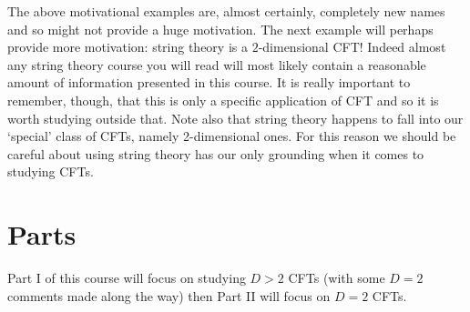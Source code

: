 The above motivational examples are, almost certainly, completely new names and so might not provide a huge motivation. The next example will perhaps provide more motivation: string theory is a $2$-dimensional CFT! Indeed almost any string theory course you will read will most likely contain a reasonable amount of information presented in this course. It is really important to remember, though, that this is only a specific application of CFT and so it is worth studying outside that. Note also that string theory happens to fall into our `special' class of CFTs, namely 2-dimensional ones. For this reason we should be careful about using string theory has our only grounding when it comes to studying CFTs.

\section{Parts}

Part I of this course will focus on studying $D>2$ CFTs (with some $D=2$ comments made along the way) then Part II will focus on $D=2$ CFTs.